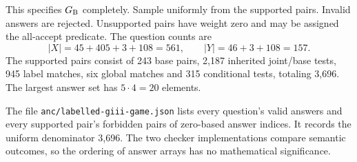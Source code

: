 This specifies $G_{\mathrm B}$ completely. Sample uniformly from the supported pairs. Invalid answers are rejected. Unsupported pairs have weight zero and may be assigned the all-accept predicate. The question counts are
\[
 |X|=45+405+3+108=561,\qquad |Y|=46+3+108=157.
\]
The supported pairs consist of 243 base pairs, 2,187 inherited joint/base tests, 945 label matches, six global matches and 315 conditional tests, totaling 3,696. The largest answer set has $5\cdot4=20$ elements.

The file \texttt{anc/labelled-giii-game.json} lists every question's valid answers and every supported pair's forbidden pairs of zero-based answer indices. It records the uniform denominator 3,696. The two checker implementations compare semantic outcomes, so the ordering of answer arrays has no mathematical significance.
